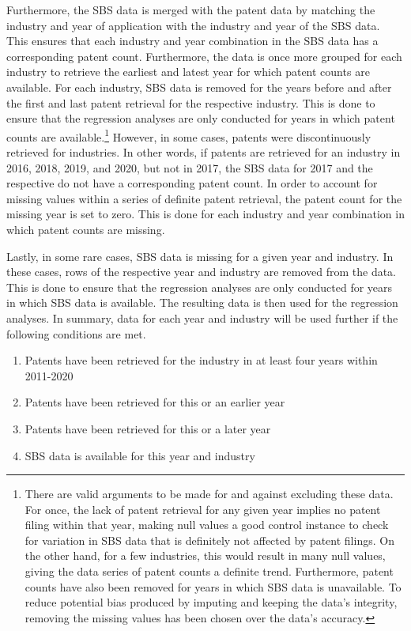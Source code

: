 \documentclass[
  11,
  a4paperpaper,
]{article}
\providecommand{\tightlist}{%
  \setlength{\itemsep}{0pt}\setlength{\parskip}{0pt}}\usepackage{longtable,booktabs,array}
\begin{document}
Furthermore, the SBS data is merged with the patent data by matching the
industry and year of application with the industry and year of the SBS
data. This ensures that each industry and year combination in the SBS
data has a corresponding patent count. Furthermore, the data is once
more grouped for each industry to retrieve the earliest and latest year
for which patent counts are available. For each industry, SBS data is
removed for the years before and after the first and last patent
retrieval for the respective industry. This is done to ensure that the
regression analyses are only conducted for years in which patent counts
are available.\footnote{There are valid arguments to be made for and
  against excluding these data. For once, the lack of patent retrieval
  for any given year implies no patent filing within that year, making
  null values a good control instance to check for variation in SBS data
  that is definitely not affected by patent filings. On the other hand,
  for a few industries, this would result in many null values, giving
  the data series of patent counts a definite trend. Furthermore, patent
  counts have also been removed for years in which SBS data is
  unavailable. To reduce potential bias produced by imputing and keeping
  the data's integrity, removing the missing values has been chosen over
  the data's accuracy.} However, in some cases, patents were
discontinuously retrieved for industries. In other words, if patents are
retrieved for an industry in 2016, 2018, 2019, and 2020, but not in
2017, the SBS data for 2017 and the respective do not have a
corresponding patent count. In order to account for missing values
within a series of definite patent retrieval, the patent count for the
missing year is set to zero. This is done for each industry and year
combination in which patent counts are missing.

Lastly, in some rare cases, SBS data is missing for a given year and
industry. In these cases, rows of the respective year and industry are
removed from the data. This is done to ensure that the regression
analyses are only conducted for years in which SBS data is available.
The resulting data is then used for the regression analyses. In summary,
data for each year and industry will be used further if the following
conditions are met.

\begin{enumerate}
\def\labelenumi{\arabic{enumi}.}
\tightlist
\item
  Patents have been retrieved for the industry in at least four years
  within 2011-2020
\item
  Patents have been retrieved for this or an earlier year
\item
  Patents have been retrieved for this or a later year
\item
  SBS data is available for this year and industry
\end{enumerate}
\end{document}
